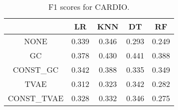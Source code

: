 \begin{table}
\caption{F1 scores for CARDIO.}
\label{tab:f1-CARDIO}
\begin{tabular}{ccccc}
\toprule
 & LR & KNN & DT & RF \\
\midrule
NONE & 0.339 & 0.346 & 0.293 & 0.249 \\
GC & 0.378 & 0.430 & 0.441 & 0.388 \\
CONST\_GC & 0.342 & 0.388 & 0.335 & 0.349 \\
TVAE & 0.312 & 0.323 & 0.342 & 0.282 \\
CONST\_TVAE & 0.328 & 0.332 & 0.346 & 0.275 \\
\bottomrule
\end{tabular}
\end{table}
